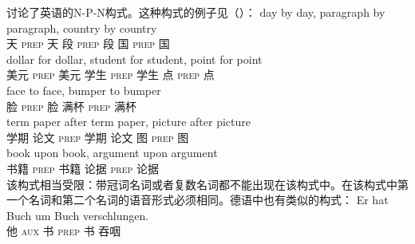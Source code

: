 \begin{exe}
\begin{xlist}[iv.]
\begin{exe}
\begin{xlist}[iv.]
\mbox{} \citet{Jackendoff2008a}讨论了英语的N-P-N构式。这种构式的例子见（）：
\eal
\ex 
\gll day by day, paragraph by paragraph, country by country\\
     天 \textsc{prep} 天 段 \textsc{prep} 段 国 \textsc{prep} 国\\
\ex
\gll dollar for dollar, student for student, point for point\\
     美元 \textsc{prep} 美元 学生 \textsc{prep} 学生 点 \textsc{prep} 点\\
\ex 
\gll face to face, bumper to bumper\\
     脸 \textsc{prep} 脸 满杯 \textsc{prep} 满杯\\
\ex
\gll term paper after term paper, picture after picture\\
     学期 论文 \textsc{prep} 学期 论文 图 \textsc{prep} 图\\
\ex 
\gll book upon book, argument upon argument\\
     书籍 \textsc{prep} 书籍 论据 \textsc{prep} 论据\\
\zl
该构式相当受限：带冠词名词或者复数名词都不能出现在该构式中。在该构式中第一个名词和第二个名词的语音形式必须相同。德语中也有类似的构式：
\eal
\ex 
\gll Er hat Buch um Buch verschlungen.\\
	 他 \textsc{aux} 书 \textsc{prep} 书 吞咽\\

\end{xlist}
\end{exe}
\end{xlist}
\end{exe}
